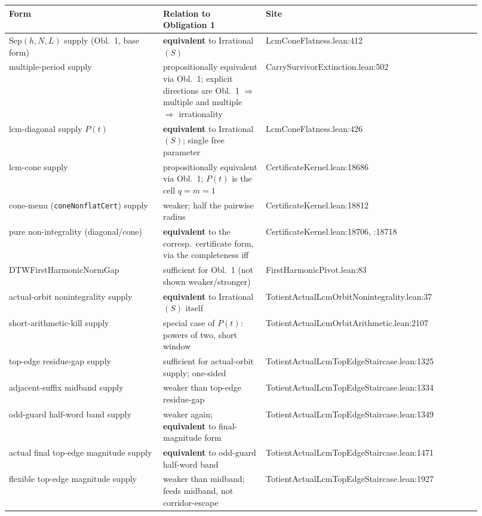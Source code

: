 \begin{center}
\begin{longtable}{p{0.30\linewidth} p{0.20\linewidth} p{0.42\linewidth}}
\textbf{Form} & \textbf{Relation to Obligation 1} & \textbf{Site} \\
\hline
\endhead
Sep$(h,N,L)$ supply (Obl.\ 1, base form) & \textbf{equivalent} to Irrational$(S)$ & LcmConeFlatness.lean:412 \\
multiple-period supply & propositionally equivalent via Obl.\ 1; explicit directions are Obl.\ 1 $\Rightarrow$ multiple and multiple $\Rightarrow$ irrationality & CarrySurvivorExtinction.lean:502 \\
lcm-diagonal supply $P(t)$ & \textbf{equivalent} to Irrational$(S)$; single free parameter & LcmConeFlatness.lean:426 \\
lcm-cone supply & propositionally equivalent via Obl.\ 1; $P(t)$ is the cell $q{=}m{=}1$ & CertificateKernel.lean:18686 \\
cone-menu (\texttt{coneNonflatCert}) supply & weaker; half the pairwise radius & CertificateKernel.lean:18812 \\
pure non-integrality (diagonal/cone) & \textbf{equivalent} to the corresp.\ certificate form, via the completeness iff & CertificateKernel.lean:18706, :18718 \\
DTWFirstHarmonicNormGap & sufficient for Obl.\ 1 (not shown weaker/stronger) & FirstHarmonicPivot.lean:83 \\
actual-orbit nonintegrality supply & \textbf{equivalent} to Irrational$(S)$ itself & TotientActualLcmOrbitNonintegrality.lean:37 \\
short-arithmetic-kill supply & special case of $P(t)$: powers of two, short window & TotientActualLcmOrbitArithmetic.lean:2107 \\
top-edge residue-gap supply & sufficient for actual-orbit supply; one-sided & TotientActualLcmTopEdgeStaircase.lean:1325 \\
adjacent-suffix midband supply & weaker than top-edge residue-gap & TotientActualLcmTopEdgeStaircase.lean:1334 \\
odd-guard half-word band supply & weaker again; \textbf{equivalent} to final-magnitude form & TotientActualLcmTopEdgeStaircase.lean:1349 \\
actual final top-edge magnitude supply & \textbf{equivalent} to odd-guard half-word band & TotientActualLcmTopEdgeStaircase.lean:1471 \\
flexible top-edge magnitude supply & weaker than midband; feeds midband, not corridor-escape & TotientActualLcmTopEdgeStaircase.lean:1927 \\

\end{longtable}
\end{center}
